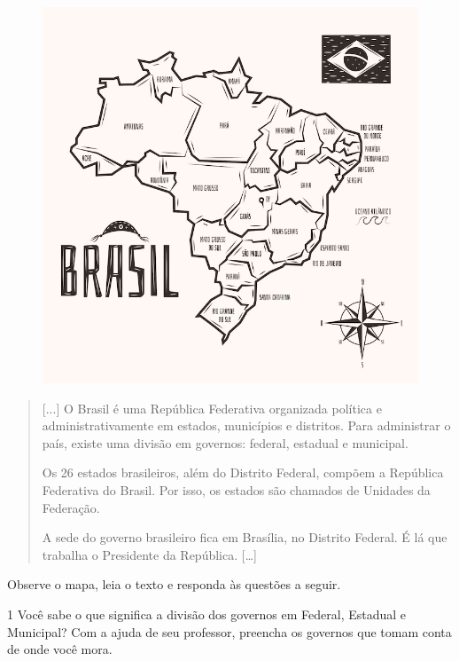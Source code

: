 
\begin{figure}[htpb!]
\includegraphics[width=\textwidth]{./imgs/img46.png}
\caption{}
\end{figure}

\begin{quote}
{[}...{]} O Brasil é uma República Federativa organizada política e
administrativamente em estados, municípios e distritos. Para administrar
o país, existe uma divisão em governos: federal, estadual e municipal.

Os 26 estados brasileiros, além do Distrito Federal, compõem a República
Federativa do Brasil. Por isso, os estados são chamados de Unidades da
Federação.

A sede do governo brasileiro fica em Brasília, no Distrito Federal. É lá
que trabalha o Presidente da República. {[}\ldots{}{]}

\end{quote}\pagebreak

\noindent{}Observe o mapa, leia o texto e responda às questões a seguir.

\num{1} Você sabe o que significa a divisão dos governos em Federal, Estadual e
Municipal? Com a ajuda de seu professor, preencha os governos que tomam
conta de onde você mora.

